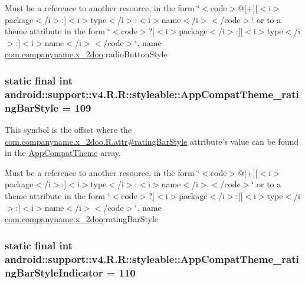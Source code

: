 Must be a reference to another resource, in the form \char`\"{}$<$code$>$@\mbox{[}+\mbox{]}\mbox{[}$<$i$>$package$<$/i$>$:\mbox{]}$<$i$>$type$<$/i$>$:$<$i$>$name$<$/i$>$$<$/code$>$\char`\"{} or to a theme attribute in the form \char`\"{}$<$code$>$?\mbox{[}$<$i$>$package$<$/i$>$:\mbox{]}\mbox{[}$<$i$>$type$<$/i$>$:\mbox{]}$<$i$>$name$<$/i$>$$<$/code$>$\char`\"{}.  name \hyperlink{namespacecom_1_1companyname_1_1x__2doo}{com.companyname.x\_\-2doo}:radioButtonStyle \hypertarget{classandroid_1_1support_1_1v4_1_1_r_1_1styleable_03df554f42548e6c63fa0608aaba9647}{
\subsubsection[{AppCompatTheme\_\-ratingBarStyle}]{\setlength{\rightskip}{0pt plus 5cm}static final int android::support::v4.R.R::styleable::AppCompatTheme\_\-ratingBarStyle = 109}}
\label{classandroid_1_1support_1_1v4_1_1_r_1_1styleable_03df554f42548e6c63fa0608aaba9647}


This symbol is the offset where the \hyperlink{classcom_1_1companyname_1_1x__2doo_1_1_r_1_1attr_a5f1e9d6f820079a4e0fb703e312ee82}{com.companyname.x\_\-2doo.R.attr\#ratingBarStyle} attribute's value can be found in the \hyperlink{classandroid_1_1support_1_1v4_1_1_r_1_1styleable_0873e92ba21076bb5a4aeadeb7f5779f}{AppCompatTheme} array.

Must be a reference to another resource, in the form \char`\"{}$<$code$>$@\mbox{[}+\mbox{]}\mbox{[}$<$i$>$package$<$/i$>$:\mbox{]}$<$i$>$type$<$/i$>$:$<$i$>$name$<$/i$>$$<$/code$>$\char`\"{} or to a theme attribute in the form \char`\"{}$<$code$>$?\mbox{[}$<$i$>$package$<$/i$>$:\mbox{]}\mbox{[}$<$i$>$type$<$/i$>$:\mbox{]}$<$i$>$name$<$/i$>$$<$/code$>$\char`\"{}.  name \hyperlink{namespacecom_1_1companyname_1_1x__2doo}{com.companyname.x\_\-2doo}:ratingBarStyle \hypertarget{classandroid_1_1support_1_1v4_1_1_r_1_1styleable_8ba7f811197cd79ba92bd8c7919d4936}{
\subsubsection[{AppCompatTheme\_\-ratingBarStyleIndicator}]{\setlength{\rightskip}{0pt plus 5cm}static final int android::support::v4.R.R::styleable::AppCompatTheme\_\-ratingBarStyleIndicator = 110}}
\label{classandroid_1_1support_1_1v4_1_1_r_1_1styleable_8ba7f811197cd79ba92bd8c7919d4936}


